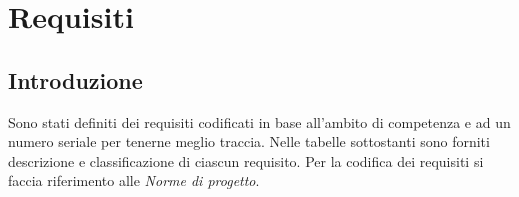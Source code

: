 


\newcommand{\RFM}{
    \stepcounter{M}
    \stepcounter{RF}
    \stepcounter{RF1}
    RF\arabic{RF}
}
\newcommand{\RFD}{
    \stepcounter{D}
    \stepcounter{RF}
    \stepcounter{RF2}
    RF\arabic{RF}
}
\newcommand{\RFO}{
    \stepcounter{O}
    \stepcounter{RF}
    \stepcounter{RF3}
    RF\arabic{RF}
}
\newcommand{\RVM}{
    \stepcounter{M}
    \stepcounter{RV}
    \stepcounter{RV1}
    RV\arabic{RV}
}
\newcommand{\RVD}{
    \stepcounter{D}
    \stepcounter{RV}
    \stepcounter{RV2}
    RV\arabic{RV}
}
\newcommand{\RVO}{
    \stepcounter{O}
    \stepcounter{RV}
    \stepcounter{RV3}
    RV\arabic{RV}
}
\newcommand{\RPM}{
    \stepcounter{M}
    \stepcounter{RP}
    \stepcounter{RP1}
    RP\arabic{RP}
}
\newcommand{\RPD}{
    \stepcounter{D}
    \stepcounter{RP}
    \stepcounter{RP2}
    RP\arabic{RP}
}
\newcommand{\RPO}{
    \stepcounter{O}
    \stepcounter{RP}
    \stepcounter{RP3}
    RP\arabic{RP}
}
\newcommand{\RQM}{
    \stepcounter{M}
    \stepcounter{RQ}
    \stepcounter{RQ1}
    RQ\arabic{RQ}
}
\newcommand{\RQD}{
    \stepcounter{D}
    \stepcounter{RQ}
    \stepcounter{RQ2}
    RQ\arabic{RQ}
}
\newcommand{\RQO}{
    \stepcounter{O}
    \stepcounter{RQ}
    \stepcounter{RQ3}
    RQ\arabic{RQ}
}



\section{Requisiti}
\subsection{Introduzione}
Sono stati definiti dei requisiti codificati in base all’ambito di competenza e ad un numero seriale per
tenerne meglio traccia. Nelle tabelle sottostanti sono forniti descrizione e classificazione di ciascun
requisito. 
Per la codifica dei requisiti si faccia riferimento alle \textit{Norme di progetto}.



